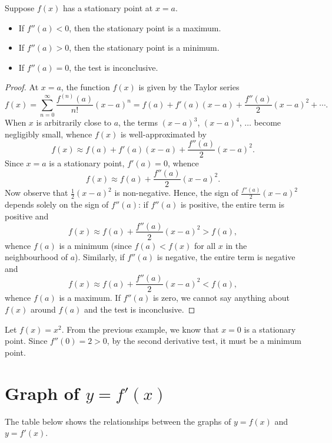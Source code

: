 \begin{proposition}\label{prop:Second-Derivative-Test}
    Suppose $f(x)$ has a stationary point at $x = a$.
    \begin{itemize}
        \item If $f''(a) < 0$, then the stationary point is a maximum.
        \item If $f''(a) > 0$, then the stationary point is a minimum.
        \item If $f''(a) = 0$, the test is inconclusive.
    \end{itemize}
\end{proposition}
\begin{proof}
    At $x = a$, the function $f(x)$ is given by the Taylor series \[f(x) = \sum_{n = 0}^\infty \frac{f^{(n)}(a)}{n!} (x-a)^n = f(a) + f'(a) (x-a) + \frac{f''(a)}{2} (x-a)^2 + \cdots.\] When $x$ is arbitrarily close to $a$, the terms $(x-a)^3$, $(x-a)^4$, $\dots$ become negligibly small, whence $f(x)$ is well-approximated by \[f(x) \approx f(a) + f'(a) (x-a) + \frac{f''(a)}{2} (x-a)^2.\] Since $x = a$ is a stationary point, $f'(a) = 0$, whence \[f(x) \approx f(a) + \frac{f''(a)}{2} (x-a)^2.\] Now observe that $\frac12 (x-a)^2$ is non-negative. Hence, the sign of $\frac{f''(a)}{2} (x-a)^2$ depends solely on the sign of $f''(a)$: if $f''(a)$ is positive, the entire term is positive and \[f(x) \approx f(a) + \frac{f''(a)}{2} (x-a)^2 > f(a),\] whence $f(a)$ is a minimum (since $f(a) < f(x)$ for all $x$ in the neighbourhood of $a$). Similarly, if $f''(a)$ is negative, the entire term is negative and \[f(x) \approx f(a) + \frac{f''(a)}{2} (x-a)^2 < f(a),\] whence $f(a)$ is a maximum. If $f''(a)$ is zero, we cannot say anything about $f(x)$ around $f(a)$ and the test is inconclusive.
\end{proof}

\begin{example}
    Let $f(x) = x^2$. From the previous example, we know that $x = 0$ is a stationary point. Since $f''(0) = 2 > 0$, by the second derivative test, it must be a minimum point.
\end{example}

\section{Graph of $y = f'(x)$}

The table below shows the relationships between the graphs of $y = f(x)$ and $y = f'(x)$.

